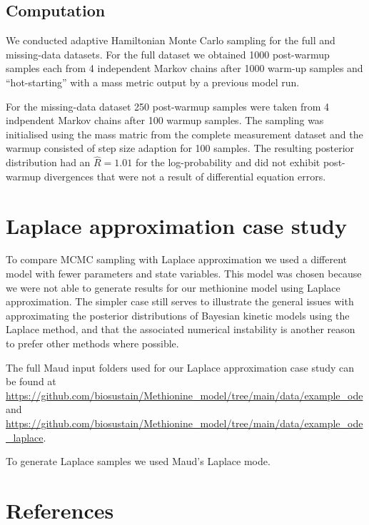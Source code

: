 \documentclass[journal=asbcd6,manuscript=article,layout=traditional]{achemso}
\begin{document}
\hypertarget{computation}{%
\subsection{Computation}\label{computation}}

We conducted adaptive Hamiltonian Monte Carlo sampling for the full and
missing-data datasets. For the full dataset we obtained 1000 post-warmup
samples each from 4 independent Markov chains after 1000 warm-up samples
and ``hot-starting'' with a mass metric output by a previous model run.

For the missing-data dataset 250 post-warmup samples were taken from 4
indpendent Markov chains after 100 warmup samples. The sampling was
initialised using the mass matric from the complete measurement dataset
and the warmup consisted of step size adaption for 100 samples. The
resulting posterior distribution had an \(\hat{R} = 1.01\) for the
log-probability and did not exhibit post-warmup divergences that were
not a result of differential equation errors.

\hypertarget{laplace-approximation-case-study}{%
\section{Laplace approximation case
study}\label{laplace-approximation-case-study}}

To compare MCMC sampling with Laplace approximation we used a different
model with fewer parameters and state variables. This model was chosen
because we were not able to generate results for our methionine model
using Laplace approximation. The simpler case still serves to illustrate
the general issues with approximating the posterior distributions of
Bayesian kinetic models using the Laplace method, and that the
associated numerical instability is another reason to prefer other
methods where possible.

The full Maud input folders used for our Laplace approximation case
study can be found at
\url{https://github.com/biosustain/Methionine_model/tree/main/data/example_ode}
and
\url{https://github.com/biosustain/Methionine_model/tree/main/data/example_ode_laplace}.

To generate Laplace samples we used Maud's Laplace mode.

\hypertarget{references}{%
\section{References}\label{references}}

\renewcommand{\bibsection}{}

\end{document}
